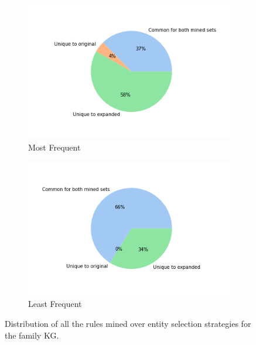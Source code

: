 \begin{figure}[h]
        \begin{subfigure}[b]{0.49\textwidth}   
            \centering 
            \includegraphics[width=\textwidth]{figures/results/entity_selection/pie_charts/most_frequent_family.png}
            \caption[]%
            {{\small Most Frequent}}    
            \label{fig:most_pie_family}
        \end{subfigure}
        \hfill
        \begin{subfigure}[b]{0.49\textwidth}   
            \centering 
            \includegraphics[width=\textwidth]{figures/results/entity_selection/pie_charts/least_frequent_family.png}
            \caption[]%
            {{\small Least Frequent}}    
            \label{fig:least_pie_family}
        \end{subfigure}
        \caption[]
        {\small Distribution of all the rules mined over entity selection strategies for the family KG.} 
        \label{fig:entity_pies_family}
    \end{figure}






